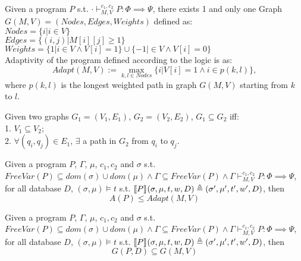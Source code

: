 \documentclass[a4paper,11pt]{article}
\begin{document}
\begin{defn}
[Adapt]
Given a program $P$ s.t. $\cdot \vdash_{M,V}^{c_1, c_2} P: \Phi \implies \Psi$, there exists 1 and only one Graph $G(M, V) = (Nodes, Edges, Weights)$ defined as:
\\
$Nodes = \{i | i \in V\}$
\\
$Edges = \{ (i, j) | M[i][j] \geq 1 \}$
\\
$ Weights = \{ 1 | i \in V \land V[i] = 1\}
        \cup \{ -1 | \in V \land V[i] = 0\}$
\\
Adaptivity of the program defined according to the logic is as:
\[
Adapt(M, V) := \max_{k, l \in Nodes}\{i | V[i] = 1 \land i \in p(k, l) \},
\]
where $p(k, l)$ is the longest weighted path in graph $G(M, V)$ starting from $k$ to $l$.
\end{defn}
%
%
\begin{defn}
[Subgraph]
Given two graphs $G_1 = (V_1, E_1)$, $G_2 = (V_2, E_2)$, $G_1 \subseteq G_2$ iff:
\\
1. $V_1 \subseteq V_2$;
\\
2. $\forall (q_i, q_j) \in E_1$, $\exists $ a path in $G_2$ from $q_i$ to $q_j$.
\end{defn}
%
%
\begin{thm}
[Soundness]
Given a program $P$, $\Gamma$, $\mu$, $c_1, c_2$ and $\sigma$ s.t. $
FreeVar(P) \subseteq dom(\sigma) \cup dom(\mu)  
\land \Gamma \subseteq FreeVar(P) 
\land \Gamma \vdash_{M,V}^{c_1,c_2} P: \Phi \implies \Psi$,
 for all database $D$, $(\sigma, \mu) \vDash t$ s.t. 
$\llbracket P \rrbracket_{} (\sigma, \mu , t ,w , D)  \triangleq  (\sigma' , \mu' , t', w' , D)$,
then
\[
A(P) \leq Adapt(M, V)
\]
\end{thm}
%
%
\begin{lem}
[Subgraph]
Given a program $P$, $\Gamma$, $\mu$, $c_1, c_2$ and $\sigma$ s.t. $
FreeVar(P) \subseteq dom(\sigma) \cup dom(\mu)  
\land \Gamma \subseteq FreeVar(P) 
\land \Gamma \vdash_{M,V}^{c_1,c_2} P: \Phi \implies \Psi$,
 for all database $D$, $(\sigma, \mu) \vDash t$ s.t. 
$\llbracket P \rrbracket_{} (\sigma, \mu , t ,w , D)  \triangleq  (\sigma' , \mu' , t', w' , D)$,
then
\[
G(P,D) \subseteq G(M, V)
\]
\end{lem}
\end{document}
